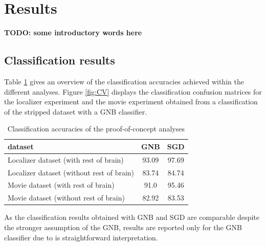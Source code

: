 \documentclass[a4paper, 12pt]{scrreprt}
\begin{document}
\section{Results}\label{section:c1_results}

\textbf{TODO: some introductory words here}

\subsection{Classification results}\label{sec:c1_cv_res}

Table \ref{tab:CV} gives an overview of the classification accuracies achieved within the different analyses. 
Figure \ref{fig:CV} displays the classification confusion matrices for the localizer experiment and the movie experiment obtained from a classification of the stripped dataset with a GNB classifier.

\begin{table}[h!]
	\begin{center}
		\caption{Classification accuracies of the proof-of-concept analyses}
		\label{tab:CV}
		\begin{tabular}{l|c|c} %
			\textbf{dataset} & \textbf{GNB} & \textbf{SGD}\\
			\hline
			Localizer dataset (with rest of brain) & 93.09 & 97.69\\
			Localizer dataset (without rest of brain) & 83.74 & 84.74\\
			Movie dataset (with rest of brain) & 91.0 & 95.46\\
			Movie dataset (without rest of brain) & 82.92 & 83.53 \\
		\end{tabular}
	\end{center}
\end{table}

As the classification results obtained with GNB and SGD are comparable despite the stronger assumption of the GNB, results are reported only for the GNB classifier due to is straightforward interpretation.
\end{document}
